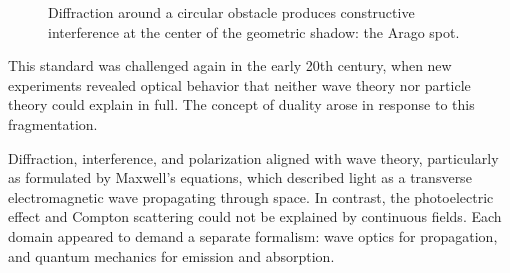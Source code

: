 \begin{figure}[h]
\centering
{}
\caption{Diffraction around a circular obstacle produces constructive interference at the center of the geometric shadow: the Arago spot.}
\end{figure}

This standard was challenged again in the early 20th century, when new experiments revealed optical behavior that neither wave theory nor particle theory could explain in full. The concept of duality arose in response to this fragmentation.

Diffraction, interference, and polarization aligned with wave theory, particularly as formulated by Maxwell's equations, which described light as a transverse electromagnetic wave propagating through space. In contrast, the photoelectric effect and Compton scattering could not be explained by continuous fields. Each domain appeared to demand a separate formalism: wave optics for propagation, and quantum mechanics for emission and absorption.

